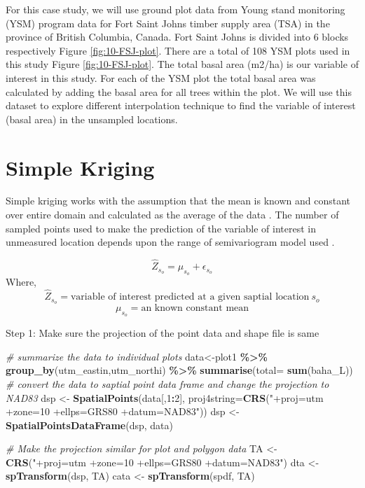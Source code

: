 \documentclass[
]{book}
\newenvironment{Shaded}{\begin{snugshade}}{\end{snugshade}}
\newcommand{\AttributeTok}[1]{\textcolor[rgb]{0.13,0.29,0.53}{#1}}
\newcommand{\CommentTok}[1]{\textcolor[rgb]{0.56,0.35,0.01}{\textit{#1}}}
\newcommand{\DecValTok}[1]{\textcolor[rgb]{0.00,0.00,0.81}{#1}}
\newcommand{\FunctionTok}[1]{\textcolor[rgb]{0.13,0.29,0.53}{\textbf{#1}}}
\newcommand{\NormalTok}[1]{#1}
\newcommand{\OtherTok}[1]{\textcolor[rgb]{0.56,0.35,0.01}{#1}}
\newcommand{\SpecialCharTok}[1]{\textcolor[rgb]{0.81,0.36,0.00}{\textbf{#1}}}
\newcommand{\StringTok}[1]{\textcolor[rgb]{0.31,0.60,0.02}{#1}}
\begin{document}
For this case study, we will use ground plot data from Young stand monitoring (YSM) program data \citep{province_of_bc_provincial_2018} for Fort Saint Johns timber supply area (TSA) in the province of British Columbia, Canada. Fort Saint Johns is divided into 6 blocks respectively Figure \ref{fig:10-FSJ-plot}. There are a total of 108 YSM plots used in this study Figure \ref{fig:10-FSJ-plot}. The total basal area (m2/ha) is our variable of interest in this study. For each of the YSM plot the total basal area was calculated by adding the basal area for all trees within the plot. We will use this dataset to explore different interpolation technique to find the variable of interest (basal area) in the unsampled locations.

\hypertarget{simple-kriging}{%
\section{Simple Kriging}\label{simple-kriging}}

Simple kriging works with the assumption that the mean is known and constant over entire domain and calculated as the average of the data \citep{wackernagel_multivariate_2002}. The number of sampled points used to make the prediction of the variable of interest in unmeasured location depends upon the range of semivariogram model used \citep{burrough_principles_1998}.

\[\hat{Z}_{s_o}=\mu_{s_o} + \epsilon_{s_o}\]
Where, \[\hat{Z}_{s_o}=\text{variable of interest predicted at a given saptial location}\ s_{o}\]
\[\mu_{s_o}=\text{an known constant mean} \]

Step 1: Make sure the projection of the point data and shape file is same

\begin{Shaded}
\begin{Highlighting}[]
\CommentTok{\# summarize the data to individual plots}
\NormalTok{data}\OtherTok{\textless{}{-}}\NormalTok{plot1 }\SpecialCharTok{\%\textgreater{}\%} 
  \FunctionTok{group\_by}\NormalTok{(utm\_eastin,utm\_northi) }\SpecialCharTok{\%\textgreater{}\%}
  \FunctionTok{summarise}\NormalTok{(}\AttributeTok{total=} \FunctionTok{sum}\NormalTok{(baha\_L))}
\CommentTok{\# convert the data to saptial point data frame and change the projection to NAD83}
\NormalTok{dsp }\OtherTok{\textless{}{-}} \FunctionTok{SpatialPoints}\NormalTok{(data[,}\DecValTok{1}\SpecialCharTok{:}\DecValTok{2}\NormalTok{], }\AttributeTok{proj4string=}\FunctionTok{CRS}\NormalTok{(}\StringTok{"+proj=utm +zone=10 +ellps=GRS80 +datum=NAD83"}\NormalTok{))}
\NormalTok{dsp }\OtherTok{\textless{}{-}} \FunctionTok{SpatialPointsDataFrame}\NormalTok{(dsp, data)}

\CommentTok{\# Make the projection similar for plot and polygon data}
\NormalTok{TA }\OtherTok{\textless{}{-}} \FunctionTok{CRS}\NormalTok{(}\StringTok{"+proj=utm +zone=10 +ellps=GRS80 +datum=NAD83"}\NormalTok{)}
\NormalTok{dta }\OtherTok{\textless{}{-}} \FunctionTok{spTransform}\NormalTok{(dsp, TA)}
\NormalTok{cata }\OtherTok{\textless{}{-}} \FunctionTok{spTransform}\NormalTok{(spdf, TA)}
\end{Highlighting}
\end{Shaded}
\end{document}
